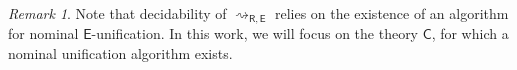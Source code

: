 \documentclass[11pt,a4paper]{amsart}
\newcommand{\daniele}[1]{\textcolor{cyan}{#1}}
\newcommand{\caleq}{\approx_{\alpha,\theory{C}}}
\newcommand{\enarrow}[1]{\rightsquigarrow_{\theory{#1}}}
\newcommand{\alert}[1]{\textcolor{red}{#1}}
\newcommand{\theory}[1]{\ensuremath{\mathsf{#1}}}
\theoremstyle{plain}
\theoremstyle{definition}
\newtheorem{example}{Example}[section]
\theoremstyle{remark}
\newtheorem{remark}[theorem]{Remark}
\begin{document}
\begin{remark} Note that decidability of $\rightsquigarrow_\theory{R,E}$ relies on the existence of an algorithm for nominal \theory{E}-unification. 
In this work, we will focus  on the theory \theory{C}, for which a nominal unification algorithm exists. %

\end{remark}








    


\end{document}
